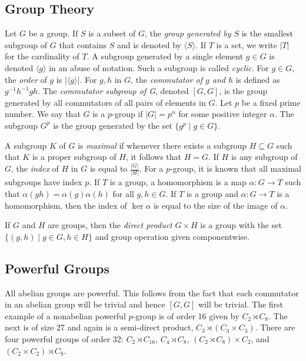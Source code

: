 \documentclass{amsart}
\numberwithin{equation} {section}
\theoremstyle{definition}
\begin{document}
\subsection{Group Theory}

Let $G$ be a group. If $S$ is a subset of $G$, the \textit{group generated by $S$} is the smallest subgroup of $G$ that contains $S$ and is denoted by $\langle S \rangle$. If $T$ is a set, we write $|T|$ for the cardinality of $T$. A subgroup generated by a single element $g \in G$ is denoted $\langle g \rangle$ in an abuse of notation. Such a subgroup is called \textit{cyclic}. For $g \in G$, the \textit{order} of $g$ is $|\langle g \rangle|$.  For $g,h$ in $G$, the \textit{commutator of $g$ and $h$} is defined as $g^{-1}h^{-1}gh$. The \textit{commutator subgroup of G}, denoted $[G,G]$, is the group generated by all commutators of all pairs of elements in $G$. Let $p$ be a fixed prime number. We say that $G$ is a $p$-group if $|G| = p^\alpha$ for some positive integer $\alpha$. The subgroup $G^p$ is the group generated by the set $\{ g^p \mid g \in G \}$.

A subgroup $K$ of $G$ is \textit{maximal} if whenever there exists a subgroup $H \subseteq G$ such that $K$ is a proper subgroup of $H$, it follows that $H = G$. If $H$ is any subgroup of $G$, the \textit{index} of $H$ in $G$ is equal to $\displaystyle\frac{|G|}{|H|}.$ For a $p$-group, it is known that all maximal subgroups have index $p$. If $T$ is a group, a homomorphism is a map $\alpha: G \rightarrow T$ such that $\alpha(gh) = \alpha(g)\alpha(h)$ for all $g, h \in G$. If $T$ is a group and $\alpha: G \rightarrow T$ is a homomorphism, then the index of $\ker \alpha$ is equal to the size of the image of $\alpha$. 

If $G$ and $H$ are groups, then the \textit{direct product} $G \times H$ is a group with the set $\{ (g,h) \mid g \in G, h \in H \} $ and group operation given componentwise.

\subsection{Powerful Groups}

All abelian groups are powerful. This follows from the fact that each commutator in an abelian group will be trivial and hence $[G,G]$ will be trivial. The first example of a nonabelian powerful $p$-group is of order 16 given by $C_2 \rtimes C_8$. The next is of size 27 and again is a semi-direct product, $C_3 \rtimes (C_3 \times C_3)$. There are four powerful groups of order 32: $C_2 \rtimes C_16$, $C_4 \rtimes C_8$, $(C_2 \rtimes C_8) \times C_2$, and $(C_2 \times C_2) \rtimes C_8$. 
\end{document}
